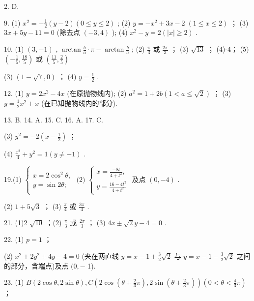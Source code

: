 \documentclass[10pt]{article}
\begin{document}
2. D.

9. (1) \({x}^{2} =  - \frac{1}{2}\left( {y - 2}\right) \left( {0 \leq  y \leq  2}\right)\) ; (2) \(y =  - {x}^{2} + {3x} - 2\;\left( {1 \leq  x \leq  2}\right)\) ； (3) \({3x} + {5y} - {11} = 0\) (除去点 \(\left( {-3,4}\right)\) ); (4) \({x}^{2} - y = 2\left( {\left| x\right|  \geq  2}\right)\) .

10. (1) \(\left( {3, - 1}\right)\) , \(\arctan \frac{b}{a} \cdot  \pi  - \arctan \frac{b}{a}\) ; (2) \(\frac{\pi }{3}\) 或 \(\frac{2\pi }{3}\) ； (3) \(\sqrt{13}\) ； (4)-4； (5) \(\left( {-\frac{1}{5},\frac{18}{5}}\right)\) 或 \(\left( {\frac{11}{5},\frac{2}{5}}\right)\)

(3) \(\left( {1 - \sqrt{7},0}\right)\) ； (4) \(y = \frac{1}{2}\) .

12. (1) \(y = 2{x}^{2} - {4x}\) (在原抛物线内); (2) \({a}^{2} = 1 + {2b}\left( {1 < a \leq  \sqrt{2}}\right)\) ； (3) \(y = \frac{1}{2}{x}^{2} + x\) (在已知抛物线内的部分).

13. B. 14. A. 15. C. 16. A. 17. C.

(3) \({y}^{2} =  - 2\left( {x - \frac{1}{2}}\right)\) ；

(4) \(\frac{{x}^{2}}{4} + {y}^{2} = 1\left( {y \neq   - 1}\right)\) .

19.(1) \(\left\{  {\begin{array}{l} x = 2{\cos }^{2}\theta , \\  y = \sin {2\theta }; \end{array}\text{ (2) }\left\{  \begin{array}{l} x = \frac{-{8t}}{4 + {t}^{2}}, \\  y = \frac{{16} - 4{t}^{2}}{4 + {t}^{2}} \end{array}\right. }\right.\) 及点 \(\left( {0, - 4}\right)\) .

(2) \(1 + 5\sqrt{3}\) ； (3) \(\frac{\pi }{4}\) 或 \(\frac{3\pi }{4}\) .

21. (1)2 \(\sqrt{10}\) ；(2) \(\frac{\pi }{3}\) 或 \(\frac{2\pi }{3}\) ； (3) \({4x} \pm  \sqrt{2}y - 4 = 0\) .

22. (1) \(p = 1\) ；

(2) \({x}^{2} + 2{y}^{2} + {4y} - 4 = 0\) (夹在两直线 \(y = x - 1 + \frac{3}{2}\sqrt{2}\) 与 \(y = x - 1 - \frac{3}{2}\sqrt{2}\) 之间的部分，含端点)及点 \((0, -\) 1).

23. (1) \(B\left( {2\cos \theta ,2\sin \theta }\right) ,C\left( {2\cos \left( {\theta  + \frac{2}{3}\pi }\right) ,2\sin \left( {\theta  + \frac{2}{3}\pi }\right) }\right) \left( {0 < \theta  < \frac{4}{3}\pi }\right)\) ；
\end{document}

